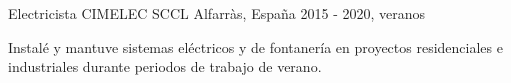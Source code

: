 \cventry
  {Electricista}
  {CIMELEC SCCL}
  {Alfarr\`as, Espa\~na}
  {2015 - 2020, veranos}
  {
    \begin{cvitems}
      \item {Instal\'e y mantuve sistemas el\'ectricos y de fontaner\'ia en proyectos residenciales e industriales durante periodos de trabajo de verano.}
    \end{cvitems}
  }
